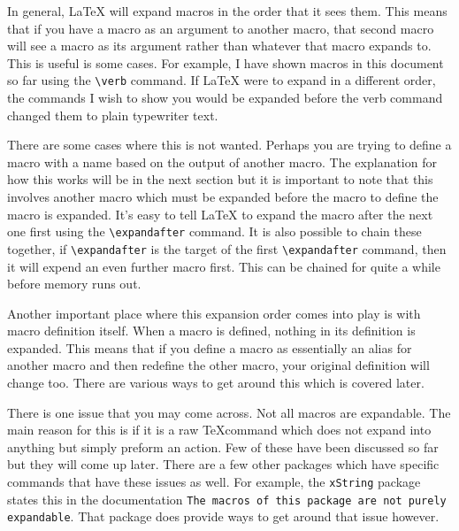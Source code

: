 In general, \LaTeX{} will expand macros in the order that it sees them. This means that if you have a macro as an argument to another macro, that second macro will see a macro as its argument rather than whatever that macro expands to. This is useful is some cases. For example, I have shown macros in this document so far using the \verb=\verb= command. If \LaTeX{} were to expand in a different order, the commands I wish to show you would be expanded before the verb command changed them to plain typewriter text. \par
There are some cases where this is not wanted. Perhaps you are trying to define a macro with a name based on the output of another macro. The explanation for how this works will be in the next section but it is important to note that this involves another macro which must be expanded before the macro to define the macro is expanded. It's easy to tell \LaTeX{} to expand the macro after the next one first using the \verb=\expandafter= command. It is also possible to chain these together, if \verb=\expandafter= is the target of the first \verb=\expandafter= command, then it will expend an even further macro first. This can be chained for quite a while before memory runs out. \par
Another important place where this expansion order comes into play is with macro definition itself. When a macro is defined, nothing in its definition is expanded. This means that if you define a macro as essentially an alias for another macro and then redefine the other macro, your original definition will change too. There are various ways to get around this which is covered later. \par
There is one issue that you may come across. Not all macros are expandable. The main reason for this is if it is a raw \TeX command which does not expand into anything but simply preform an action. Few of these have been discussed so far but they will come up later. There are a few other packages which have specific commands that have these issues as well. For example, the \texttt{xString} package states this in the documentation \texttt{The macros of this package are not purely expandable}. That package does provide ways to get around that issue however.
